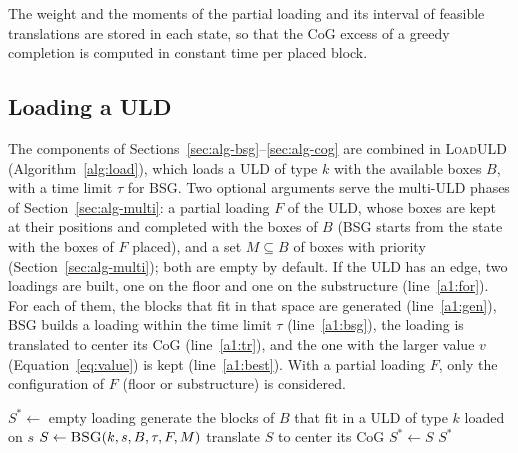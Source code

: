 The weight and the moments of the partial loading and its interval of feasible translations
are stored in each state, so that the CoG excess of a greedy completion is computed in constant
time per placed block.

\subsection{Loading a ULD}
\label{sec:alg-load}

The components of Sections~\ref{sec:alg-bsg}--\ref{sec:alg-cog} are combined in
\textsc{LoadULD} (Algorithm~\ref{alg:load}), which loads a ULD of type $k$ with the available boxes
$B$, with a time limit $\tau$ for BSG. Two optional arguments serve the multi-ULD phases of
Section~\ref{sec:alg-multi}: a partial loading $F$ of the ULD, whose boxes are kept at their
positions and completed with the boxes of $B$ (BSG starts from the state with the boxes of $F$
placed), and a set $M \subseteq B$ of boxes with priority (Section~\ref{sec:alg-multi}); both are
empty by default. If the ULD has an edge, two loadings are built, one on the floor and one on the substructure
(line~\ref{a1:for}). For each of them, the blocks that fit in that space are generated
(line~\ref{a1:gen}), BSG builds a loading within the time limit $\tau$ (line~\ref{a1:bsg}), the
loading is translated to center its CoG (line~\ref{a1:tr}), and the one with the larger value
$v$ (Equation~\ref{eq:value}) is kept (line~\ref{a1:best}). With a partial loading $F$, only
the configuration of $F$ (floor or substructure) is considered.

\begin{algorithm}[htbp]
\caption{\textsc{LoadULD}$(k, B, \tau, F = \emptyset, M = \emptyset)$: load a ULD of type $k$
with the available boxes $B$ and the time limit $\tau$ for each run of BSG, completing the partial
loading $F$ and giving priority to the boxes of $M \subseteq B$.}
\label{alg:load}
\begin{algorithmic}[1]
\State $S^* \gets$ empty loading
 \label{a1:for}
	\State generate the blocks of $B$ that fit in a ULD of type $k$ loaded on $s$ \label{a1:gen}
	\State $S \gets \textsc{BSG}(k, s, B, \tau, F, M)$  \label{a1:bsg}
	\State translate $S$ to center its CoG \label{a1:tr}
	 $S^* \gets S$ \EndIf \label{a1:best}
\EndFor
\State \Return $S^*$
\end{algorithmic}
\end{algorithm}

